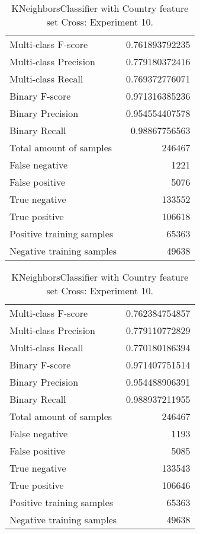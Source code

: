\begin{table}[H]
\begin{minipage}{0.5\textwidth}
\caption{KNeighborsClassifier with Country feature set Cross: Experiment 9.}
\centering
\begin{tabular}{l r}
\toprule
Multi-class F-score & 0.761893792235 \\
Multi-class Precision & 0.779180372416 \\
Multi-class Recall & 0.769372776071 \\
\midrule
Binary F-score & 0.971316385236 \\
Binary Precision & 0.954554407578 \\
Binary Recall & 0.98867756563 \\
\midrule
Total amount of samples & 246467 \\
False negative & 1221 \\
False positive & 5076 \\
True negative & 133552 \\
True positive & 106618 \\
\midrule
Positive training samples & 65363 \\
Negative training samples & 49638 \\
\bottomrule
\end{tabular}
\end{minipage}
\hfillx
\begin{minipage}{0.5\textwidth}
\caption{KNeighborsClassifier with Country feature set Cross: Experiment 10.}
\centering
\begin{tabular}{l r}
\toprule
Multi-class F-score & 0.762384754857 \\
Multi-class Precision & 0.779110772829 \\
Multi-class Recall & 0.770180186394 \\
\midrule
Binary F-score & 0.971407751514 \\
Binary Precision & 0.954488906391 \\
Binary Recall & 0.988937211955 \\
\midrule
Total amount of samples & 246467 \\
False negative & 1193 \\
False positive & 5085 \\
True negative & 133543 \\
True positive & 106646 \\
\midrule
Positive training samples & 65363 \\
Negative training samples & 49638 \\
\bottomrule
\end{tabular}
\end{minipage}
\end{table}

